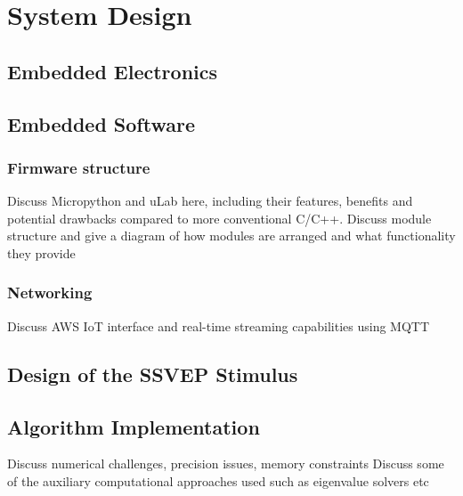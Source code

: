 \chapter{System Design}
\label{chapter:system-design}

\graphicspath{ {report/Chapter5/assets/} } 

\section{Embedded Electronics}

\section{Embedded Software}
\subsection{Firmware structure}
Discuss Micropython and uLab here, including their features, benefits and potential drawbacks compared to more conventional C/C++.
Discuss module structure and give a diagram of how modules are arranged and what functionality they provide

\subsection{Networking}
Discuss AWS IoT interface and real-time streaming capabilities using MQTT

\section{Design of the SSVEP Stimulus}

\section{Algorithm Implementation}
Discuss numerical challenges, precision issues, memory constraints
Discuss some of the auxiliary computational approaches used such as eigenvalue solvers etc

